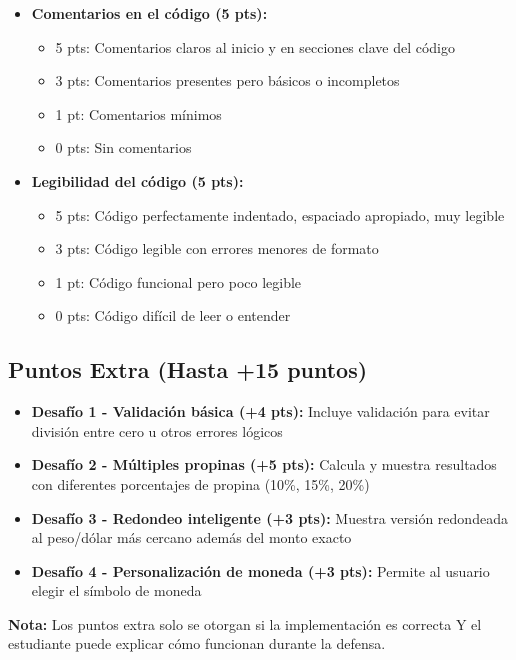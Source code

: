 \documentclass[12pt,a4paper]{article}
\begin{document}
\begin{itemize}[leftmargin=*]
    \item \textbf{Comentarios en el código (5 pts):}
    \begin{itemize}
        \item 5 pts: Comentarios claros al inicio y en secciones clave del código
        \item 3 pts: Comentarios presentes pero básicos o incompletos
        \item 1 pt: Comentarios mínimos
        \item 0 pts: Sin comentarios
    \end{itemize}
    
    \item \textbf{Legibilidad del código (5 pts):}
    \begin{itemize}
        \item 5 pts: Código perfectamente indentado, espaciado apropiado, muy legible
        \item 3 pts: Código legible con errores menores de formato
        \item 1 pt: Código funcional pero poco legible
        \item 0 pts: Código difícil de leer o entender
    \end{itemize}
\end{itemize}

\subsection{Puntos Extra (Hasta +15 puntos)}

\begin{itemize}[leftmargin=*]
    \item \textbf{Desafío 1 - Validación básica (+4 pts):} Incluye validación para evitar división entre cero u otros errores lógicos
    \item \textbf{Desafío 2 - Múltiples propinas (+5 pts):} Calcula y muestra resultados con diferentes porcentajes de propina (10\%, 15\%, 20\%)
    \item \textbf{Desafío 3 - Redondeo inteligente (+3 pts):} Muestra versión redondeada al peso/dólar más cercano además del monto exacto
    \item \textbf{Desafío 4 - Personalización de moneda (+3 pts):} Permite al usuario elegir el símbolo de moneda
\end{itemize}

\textbf{Nota:} Los puntos extra solo se otorgan si la implementación es correcta Y el estudiante puede explicar cómo funcionan durante la defensa.
\end{document}
